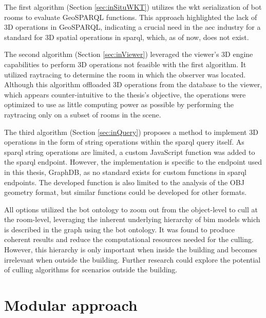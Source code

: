 The first algorithm (Section \ref{sec:inSituWKT}) utilizes the \ac{wkt} serialization of \ac{bot} rooms to evaluate GeoSPARQL functions. This approach highlighted the lack of 3D operations in GeoSPARQL, indicating a crucial need in the \ac{aec} industry for a standard for 3D spatial operations in \ac{sparql}, which, as of now, does not exist.

The second algorithm (Section \ref{sec:inViewer}) leveraged the viewer's 3D engine capabilities to perform 3D operations not feasible with the first algorithm. It utilized raytracing to determine the room in which the observer was located. Although this algorithm offloaded 3D operations from the database to the viewer, which appears counter-intuitive to the thesis's objective, the operations were optimized to use as little computing power as possible by performing the raytracing only on a subset of rooms in the scene.

The third algorithm (Section \ref{sec:inQuery}) proposes a method to implement 3D operations in the form of string operations within the \ac{sparql} query itself. As \ac{sparql} string operations are limited, a custom JavaScript function was added to the \ac{sparql} endpoint. However, the implementation is specific to the endpoint used in this thesis, GraphDB, as no standard exists for custom functions in \ac{sparql} endpoints. The developed function is also limited to the analysis of the OBJ geometry format, but similar functions could be developed for other formats.

All options utilized the \ac{bot} ontology to zoom out from the object-level to cull at the room-level, leveraging the inherent underlying hierarchy of \ac{bim} models which is described in the graph using the \ac{bot} ontology. It was found to produce coherent results and reduce the computational resources needed for the culling. However, this hierarchy is only important when inside the building and becomes irrelevant when outside the building. Further research could explore the potential of culling algorithms for scenarios outside the building.

\section{Modular approach}



